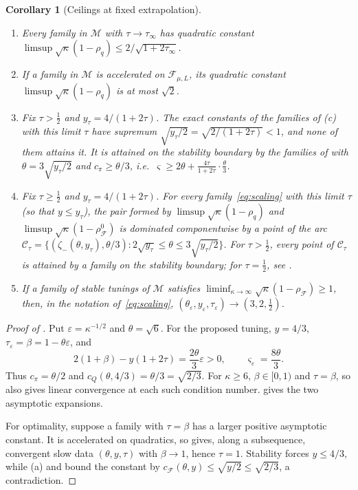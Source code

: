 \documentclass[11pt]{article}
\newtheorem{corollary}[theorem]{Corollary}
\theoremstyle{definition}
\theoremstyle{remark}
\newcommand{\cF}{\mathcal F}
\newcommand{\cM}{\mathcal M}
\newcommand{\rhoF}{\rho_{\cF}}
\newcommand{\rhoz}{\rho_{\cF}^{0}}
\newcommand{\cQ}{c_{Q}}
\newcommand{\cFF}{c_{\cF}}
\newcommand{\cpi}{c_{\pi}}
\begin{document}
\begin{samepage}
\begin{corollary}[Ceilings at fixed extrapolation]\label{cor:frontier}
\leavevmode
\begin{enumerate}[label=\textup{(\roman*)}]
\item Every family in \(\cM\) with \(\tau\to\tau_\infty\) has quadratic constant
\(\limsup\sqrt\kappa(1-\rho_q)\le2/\sqrt{1+2\tau_\infty}\).
\item If a family in \(\cM\) is accelerated on \(\cF_{\mu,L}\), its quadratic
constant \(\limsup\sqrt\kappa(1-\rho_q)\) is at most \(\sqrt2\).
\item Fix \(\tau>\frac12\) and \(y_\tau=4/(1+2\tau)\).  The exact constants of the families of (c) with this
limit \(\tau\) have supremum \(\sqrt{y_\tau/2}=\sqrt{2/(1+2\tau)}<1\), and none of them attains it.  It is attained on the
stability boundary by the families of  with \(\theta=3\sqrt{y_\tau/2}\) and \(\cpi\ge\theta/3\), i.e.\
\(\varsigma\ge2\theta+\frac{4\tau}{1+2\tau}\cdot\frac\theta3\).
\item Fix \(\tau\ge\frac12\) and \(y_\tau=4/(1+2\tau)\).  For every family~\eqref{eq:scaling} with this
limit \(\tau\) (so that \(y\le y_\tau\)), the pair formed by \(\limsup\sqrt\kappa(1-\rho_q)\) and
\(\limsup\sqrt\kappa(1-\rhoz)\) is dominated componentwise by a point of the arc
\(\mathcal C_\tau=\{(\zeta_-(\theta,y_\tau),\theta/3):2\sqrt{y_\tau}\le\theta\le3\sqrt{y_\tau/2}\}\).  For \(\tau>\frac12\), every point of
\(\mathcal C_\tau\) is attained by a family on the stability boundary; for \(\tau=\frac12\), see \Cref{cor:arc}.
\item If a family of stable tunings of \(\cM\) satisfies \(\liminf_{\kappa\to\infty}\sqrt\kappa(1-\rhoF)\ge1\), then, in the
notation of~\eqref{eq:scaling}, \((\theta_\varepsilon,y_\varepsilon,\tau_\varepsilon)\to(3,2,\frac12)\).
\end{enumerate}
\end{corollary}
\end{samepage}

\begin{proof}[Proof of ]
Put \(\varepsilon=\kappa^{-1/2}\) and \(\theta=\sqrt6\).
For the proposed tuning, \(y=4/3\), \(\tau_\varepsilon=\beta
=1-\theta\varepsilon\), and
\[
2(1+\beta)-y(1+2\tau)=\frac{2\theta}{3}\varepsilon>0,
\qquad \varsigma_\varepsilon=\frac{8\theta}{3}.
\]
Thus \(c_\pi=\theta/2\) and
\(\cQ(\theta,4/3)=\theta/3=\sqrt{2/3}\).
For \(\kappa\ge6\), \(\beta\in[0,1)\) and \(\tau=\beta\), so
 also gives linear convergence at each such condition number.
\Cref{prop:boundary} gives the two asymptotic expansions.

For optimality, suppose a family with \(\tau=\beta\) has a larger
positive asymptotic constant.  It is accelerated on quadratics, so
\Cref{lem:accel} gives, along a subsequence, convergent slow data
\((\theta,y,\tau)\) with \(\beta\to1\), hence \(\tau=1\).
Stability forces \(y\le4/3\), while (a) and
 bound the constant by
\(\cFF(\theta,y)\le\sqrt{y/2}\le\sqrt{2/3}\), a contradiction.
\end{proof}
\end{document}
